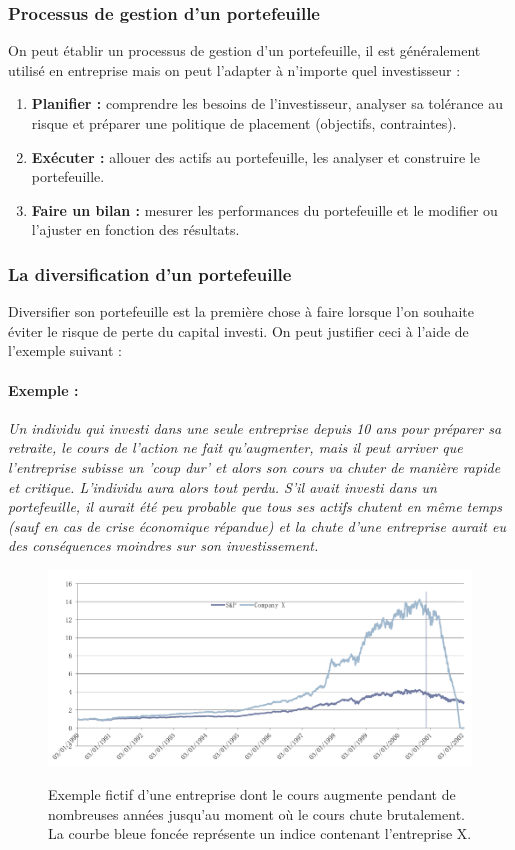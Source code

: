 \subsubsection{Processus de gestion d'un portefeuille}
On peut établir un processus de gestion d'un portefeuille, il est généralement utilisé en entreprise mais on peut l'adapter à n'importe quel investisseur :
\begin{enumerate}
 \item \textbf{Planifier :} comprendre les besoins de l'investisseur, analyser sa tolérance au risque et préparer une politique de placement (objectifs, contraintes).
 \item \textbf{Exécuter :} allouer des actifs au portefeuille, les analyser et construire le portefeuille.
 \item \textbf{Faire un bilan :} mesurer les performances du portefeuille et le modifier ou l'ajuster en fonction des résultats.
\end{enumerate}

\subsubsection{La diversification d'un portefeuille}
Diversifier son portefeuille est la première chose à faire lorsque l'on souhaite éviter le risque de perte du capital investi. On peut justifier ceci à l'aide de l'exemple suivant :

\paragraph{Exemple :} \textit{Un individu qui investi dans une seule entreprise depuis 10 ans pour préparer sa retraite, le cours de l'action ne fait qu'augmenter, mais il peut arriver que l'entreprise subisse un 'coup dur' et alors son cours va chuter de manière rapide et critique. L'individu aura alors tout perdu.
	  S'il avait investi dans un portefeuille, il aurait été peu probable que tous ses actifs chutent en même temps (sauf en cas de crise économique répandue) et la chute d'une entreprise aurait eu des conséquences moindres sur son investissement.}
	  \begin{figure}[H]
	    \center
	    \includegraphics[scale=0.4]{../graph/exempleChuteEntreprise.png} \\
	    \caption{Exemple fictif d'une entreprise dont le cours augmente pendant de nombreuses années jusqu'au moment où le cours chute brutalement. La courbe bleue foncée représente un indice contenant l'entreprise X.}
	  \end{figure}
	  
